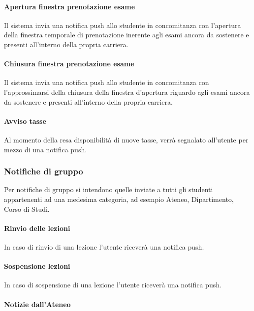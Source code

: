 \paragraph{Apertura finestra prenotazione esame\\}

Il sistema invia una notifica push allo studente in concomitanza con l’apertura della finestra temporale di prenotazione inerente agli esami ancora da sostenere e presenti all’interno della propria carriera.

\paragraph{Chiusura finestra prenotazione esame\\}

Il sistema invia una notifica push allo studente in concomitanza con l’approssimarsi della chiusura della finestra d’apertura riguardo agli esami ancora da sostenere e presenti all’interno della propria carriera.

\paragraph{Avviso tasse}

Al momento della resa disponibilità di nuove tasse, verrà segnalato all’utente per mezzo di una notifica push.

\subsubsection{Notifiche di gruppo}

Per notifiche di gruppo si intendono quelle inviate a tutti gli studenti appartenenti ad una medesima categoria, ad esempio Ateneo, Dipartimento, Corso di Studi.

\paragraph{Rinvio delle lezioni}

In caso di rinvio di una lezione l’utente riceverà una notifica push.

\paragraph{Sospensione lezioni}

In caso di sospensione di una lezione l’utente riceverà una notifica push.

\paragraph{Notizie dall'Ateneo}

